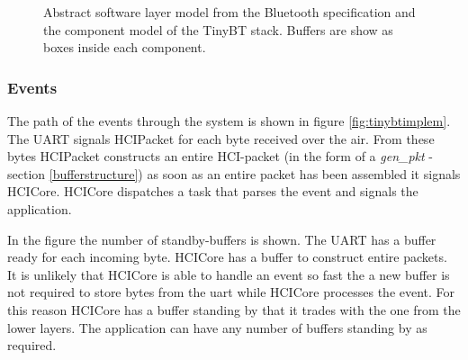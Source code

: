 \documentclass[a4paper,10pt]{article}
\begin{document}
\begin{figure}[tbp]
\centering
{}
\caption{Abstract software layer model from the Bluetooth
  specification and the component model of the TinyBT stack. Buffers
  are show as boxes inside each component.}
\end{figure}

\subsubsection{Events}
The path of the events through the system is shown in figure
\ref{fig:tinybtimplem}. The UART signals HCIPacket for each byte
received over the air. From these bytes HCIPacket constructs an entire
HCI-packet (in the form of a \emph{gen\_pkt} - section
\ref{bufferstructure}) as soon as an entire packet has been assembled
it signals HCICore. HCICore dispatches a task that parses the event
and signals the application.

In the figure the number of standby-buffers is shown. The UART has a
buffer ready for each incoming byte. HCICore has a buffer to construct
entire packets. It is unlikely that HCICore is able to handle an event
so fast the a new buffer is not required to store bytes from the uart
while HCICore processes the event. For this reason HCICore has a
buffer standing by that it trades with the one from the lower layers.
The application can have any number of buffers standing by as
required.
\end{document}
